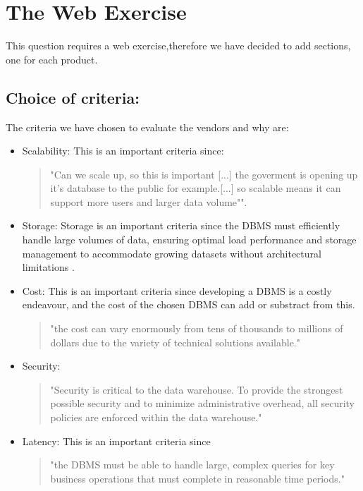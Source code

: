 \section{The Web Exercise}
This question requires a web exercise,therefore we have decided to add sections, one for each product. 

\subsection{Choice of criteria:}
The criteria we have chosen to evaluate the vendors and why are:
\begin{itemize}
    \item Scalability: This is an important criteria since:
    \begin{quotation}
        "Can we scale up, so this is important [...] the goverment is opening up it's database to the public for example.[...] so scalable means it can support more users and larger data volume"\cite{l1video}".
    \end{quotation}
    \item Storage: Storage is an important criteria since
    the DBMS must efficiently handle large volumes of data, 
    ensuring optimal load performance and storage management to 
    accommodate growing datasets without architectural limitations \cite[p. 1239]{CourseLitt}.
    \item Cost: This is an important criteria since developing a DBMS is a costly endeavour, and the cost of the chosen DBMS can add or substract from this. \begin{quotation}
        "the cost can vary enormously from tens of thousands to millions of dollars due to
    the variety of technical solutions available." \cite[p. 1226]{CourseLitt}
    \end{quotation}
    \item Security: \begin{quote}
        "Security is critical to the data warehouse. To provide the strongest possible
security and to minimize administrative overhead, all security policies are enforced
within the data warehouse."\cite[p. 1309]{CourseLitt}
    \end{quote}
    \item Latency: This is an important criteria since \begin{quotation}
         "the DBMS must be able to handle large, complex queries for key business operations that must complete in reasonable time periods." \cite[p. 1239]{CourseLitt}
    \end{quotation} 
\end{itemize}
